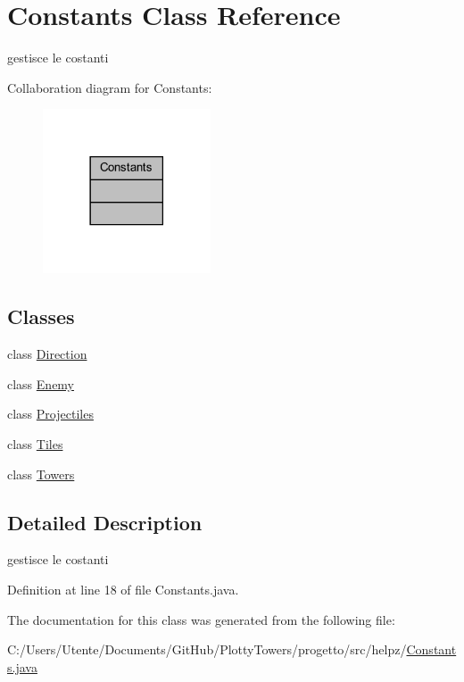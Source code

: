 \hypertarget{classhelpz_1_1_constants}{}\section{Constants Class Reference}
\label{classhelpz_1_1_constants}


gestisce le costanti  




Collaboration diagram for Constants\+:\nopagebreak
\begin{figure}[H]
\begin{center}
\leavevmode
\includegraphics[width=141pt]{classhelpz_1_1_constants__coll__graph}
\end{center}
\end{figure}
\subsection*{Classes}
\begin{DoxyCompactItemize}
\item 
class \hyperlink{classhelpz_1_1_constants_1_1_direction}{Direction}
\item 
class \hyperlink{classhelpz_1_1_constants_1_1_enemy}{Enemy}
\item 
class \hyperlink{classhelpz_1_1_constants_1_1_projectiles}{Projectiles}
\item 
class \hyperlink{classhelpz_1_1_constants_1_1_tiles}{Tiles}
\item 
class \hyperlink{classhelpz_1_1_constants_1_1_towers}{Towers}
\end{DoxyCompactItemize}


\subsection{Detailed Description}
gestisce le costanti 

Definition at line 18 of file Constants.\+java.



The documentation for this class was generated from the following file\+:\begin{DoxyCompactItemize}
\item 
C\+:/\+Users/\+Utente/\+Documents/\+Git\+Hub/\+Plotty\+Towers/progetto/src/helpz/\hyperlink{_constants_8java}{Constants.\+java}\end{DoxyCompactItemize}
